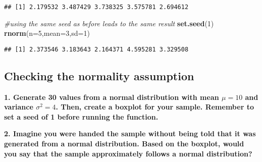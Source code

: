 \documentclass[
]{book}
\newenvironment{Shaded}{\begin{snugshade}}{\end{snugshade}}
\newcommand{\AttributeTok}[1]{\textcolor[rgb]{0.13,0.29,0.53}{#1}}
\newcommand{\CommentTok}[1]{\textcolor[rgb]{0.56,0.35,0.01}{\textit{#1}}}
\newcommand{\DecValTok}[1]{\textcolor[rgb]{0.00,0.00,0.81}{#1}}
\newcommand{\FunctionTok}[1]{\textcolor[rgb]{0.13,0.29,0.53}{\textbf{#1}}}
\newcommand{\NormalTok}[1]{#1}
\begin{document}
\begin{verbatim}
## [1] 2.179532 3.487429 3.738325 3.575781 2.694612
\end{verbatim}

\begin{Shaded}
\begin{Highlighting}[]
\CommentTok{\#using the same seed as before leads to the same result}
\FunctionTok{set.seed}\NormalTok{(}\DecValTok{1}\NormalTok{)}
\FunctionTok{rnorm}\NormalTok{(}\AttributeTok{n=}\DecValTok{5}\NormalTok{,}\AttributeTok{mean=}\DecValTok{3}\NormalTok{,}\AttributeTok{sd=}\DecValTok{1}\NormalTok{)}
\end{Highlighting}
\end{Shaded}

\begin{verbatim}
## [1] 2.373546 3.183643 2.164371 4.595281 3.329508
\end{verbatim}

\hypertarget{checking-the-normality-assumption}{%
\subsection{Checking the normality assumption}\label{checking-the-normality-assumption}}

\textbf{1. Generate 30 values from a normal distribution with mean \(\mu=10\) and variance \(\sigma^{2}=4\). Then, create a boxplot for your sample. Remember to set a seed of 1 before running the function.}

\textbf{2. Imagine you were handed the sample without being told that it was generated from a normal distribution. Based on the boxplot, would you say that the sample approximately follows a normal distribution?}
\end{document}
